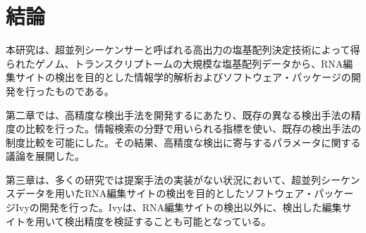 \chapter{結論}
本研究は、超並列シーケンサーと呼ばれる高出力の塩基配列決定技術によって得られたゲノム、トランスクリプトームの大規模な塩基配列データから、RNA編集サイトの検出を目的とした情報学的解析およびソフトウェア・パッケージの開発を行ったものである。
\par
第二章では、高精度な検出手法を開発するにあたり、既存の異なる検出手法の精度の比較を行った。情報検索の分野で用いられる指標を使い、既存の検出手法の制度比較を可能にした。その結果、高精度な検出に寄与するパラメータに関する議論を展開した。
\par
第三章は、多くの研究では提案手法の実装がない状況において、超並列シーケンスデータを用いたRNA編集サイトの検出を目的としたソフトウェア・パッケージIvyの開発を行った。Ivyは、RNA編集サイトの検出以外に、検出した編集サイトを用いて検出精度を検証することも可能となっている。
